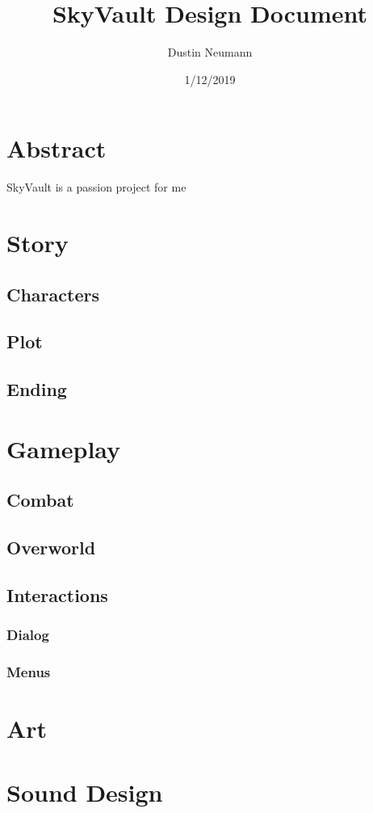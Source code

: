 \documentclass{article}
\begin{document}
\author{Dustin Neumann}
\title{SkyVault Design Document}
\date{1/12/2019}
\maketitle

\section{Abstract}
SkyVault is a passion project for me

\section{Story} 

\subsection{Characters}
\subsection{Plot}
\subsection{Ending} 

\section{Gameplay} 

\subsection{Combat} 
\subsection{Overworld} 

\subsection{Interactions}
\subsubsection{Dialog}
\subsubsection{Menus} 

\section{Art}

\section{Sound Design}
\end{document}
